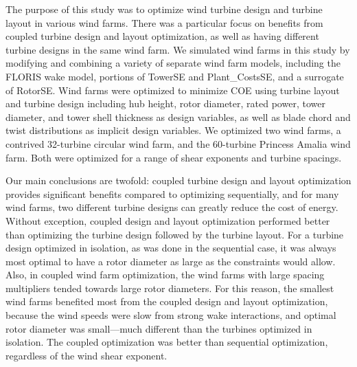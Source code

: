 \documentclass[WESD, manuscript]{copernicus}
\begin{document}
\conclusions 
The purpose of this study was to optimize wind turbine design and turbine layout in various wind farms. There was a particular focus on benefits from coupled turbine design and layout optimization, as well as having different turbine designs in the same wind farm. We simulated wind farms in this study by modifying and combining a variety of separate wind farm models, including the FLORIS wake model, portions of TowerSE and Plant\_CostsSE, and a surrogate of RotorSE. Wind farms were optimized to minimize COE using turbine layout and turbine design including hub height, rotor diameter, rated power, tower diameter, and tower shell thickness as design variables, as well as blade chord and twist distributions as implicit design variables. We optimized two wind farms, a contrived 32-turbine circular wind farm, and the 60-turbine Princess Amalia wind farm. Both were optimized for a range of shear exponents and turbine spacings. 

Our main conclusions are twofold: coupled turbine design and layout optimization provides significant benefits compared to optimizing sequentially,  and for many wind farms, two different turbine designs can greatly reduce the cost of energy. Without exception, coupled design and layout optimization performed better than optimizing the turbine design followed by the turbine layout. For a turbine design optimized in isolation, as was done in the sequential case, it was always most optimal to have a rotor diameter as large as the constraints would allow. Also, in coupled wind farm optimization, the wind farms with large spacing multipliers tended towards large rotor diameters. For this reason, the smallest wind farms benefited most from the coupled design and layout optimization, because the wind speeds were slow from strong wake interactions, and optimal rotor diameter was small---much different than the turbines optimized in isolation. The coupled optimization was  better than sequential optimization, regardless of the wind shear exponent. 
\end{document}
